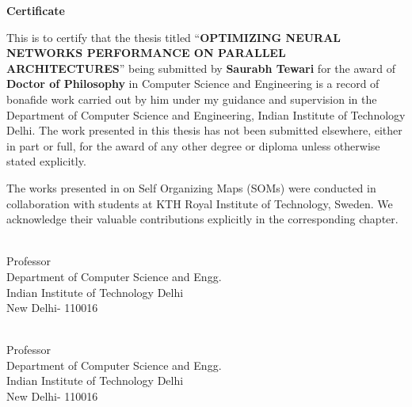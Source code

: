 {}
\begin{center}
	{\Huge \textbf{Certificate}} 
\end{center}

This is to certify that the thesis titled ``\textbf{OPTIMIZING NEURAL NETWORKS
	PERFORMANCE ON PARALLEL
	ARCHITECTURES}'' being submitted by  \textbf{Saurabh Tewari} for the award of \textbf{Doctor of Philosophy} in Computer Science and Engineering is a record of bonafide work carried out by him  under my guidance and supervision in the Department of Computer Science and Engineering, Indian Institute of Technology Delhi. The work presented in this thesis has not been submitted elsewhere, either in part or full, for the award of any other degree or diploma unless otherwise stated explicitly. 

The works presented in  on Self Organizing Maps (SOMs) were conducted in collaboration with students at KTH Royal Institute of Technology, Sweden. We acknowledge their valuable contributions explicitly in the corresponding chapter.

\vspace {10 pc}

\begin{multicols}{2}
 \\
Professor \\
Department of Computer Science and Engg. \\
Indian Institute of Technology Delhi \\
New Delhi- 110016 \\
\columnbreak

\\
Professor \\
Department of Computer Science and Engg.\\
Indian Institute of Technology Delhi \\
New Delhi- 110016
\end{multicols}